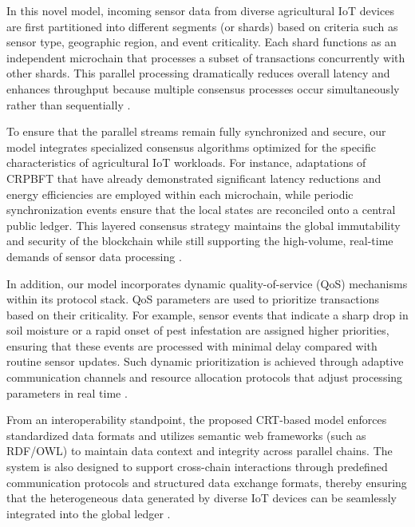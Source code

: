 \documentclass[12pt,onecolumn]{IEEEtran} %
\begin{document}
In this novel model, incoming sensor data from diverse agricultural IoT devices are first partitioned into different segments (or shards) based on criteria such as sensor type, geographic region, and event criticality. Each shard functions as an independent microchain that processes a subset of transactions concurrently with other shards. This parallel processing dramatically reduces overall latency and enhances throughput because multiple consensus processes occur simultaneously rather than sequentially \cite{thiruvenkatasamy2025anonlinetool, hussein2024aiandiot}.

To ensure that the parallel streams remain fully synchronized and secure, our model integrates specialized consensus algorithms optimized for the specific characteristics of agricultural IoT workloads. For instance, adaptations of CRPBFT that have already demonstrated significant latency reductions and energy efficiencies are employed within each microchain, while periodic synchronization events ensure that the local states are reconciled onto a central public ledger. This layered consensus strategy maintains the global immutability and security of the blockchain while still supporting the high-volume, real-time demands of sensor data processing \cite{thiruvenkatasamy2025anonlinetool, huang2025digitaltraceabilityin}.

In addition, our model incorporates dynamic quality-of-service (QoS) mechanisms within its protocol stack. QoS parameters are used to prioritize transactions based on their criticality. For example, sensor events that indicate a sharp drop in soil moisture or a rapid onset of pest infestation are assigned higher priorities, ensuring that these events are processed with minimal delay compared with routine sensor updates. Such dynamic prioritization is achieved through adaptive communication channels and resource allocation protocols that adjust processing parameters in real time \cite{singh2025blockchainandflbased, thiruvenkatasamy2025anonlinetool}.

From an interoperability standpoint, the proposed CRT-based model enforces standardized data formats and utilizes semantic web frameworks (such as RDF/OWL) to maintain data context and integrity across parallel chains. The system is also designed to support cross-chain interactions through predefined communication protocols and structured data exchange formats, thereby ensuring that the heterogeneous data generated by diverse IoT devices can be seamlessly integrated into the global ledger \cite{irfan2025aniotdrivensmart, huang2025digitaltraceabilityin}.
\end{document}
